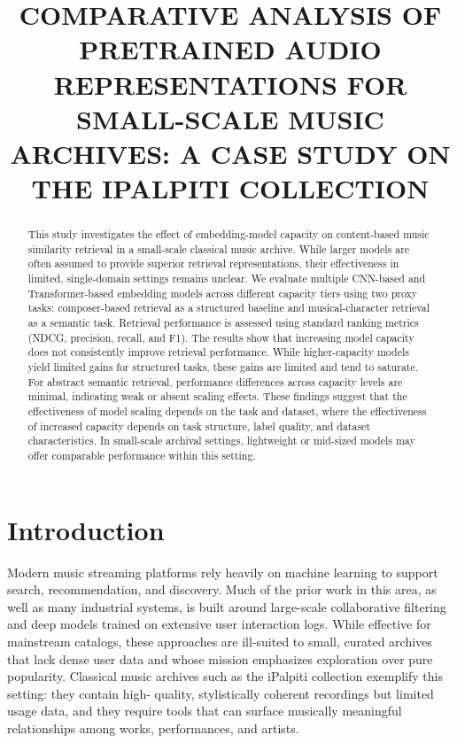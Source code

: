 \documentclass{article}
\title{COMPARATIVE ANALYSIS OF PRETRAINED AUDIO REPRESENTATIONS FOR SMALL-SCALE MUSIC ARCHIVES: A CASE STUDY ON THE IPALPITI COLLECTION}
\begin{document}
\maketitle

\begin{abstract}
This study investigates the effect of embedding-model capacity on content-based music similarity retrieval in a small-scale classical music archive. 
While larger models are often assumed to provide superior retrieval representations, their effectiveness in limited, single-domain settings remains unclear.
We evaluate multiple CNN-based and Transformer-based embedding models across different capacity tiers using two proxy tasks: composer-based retrieval as a structured baseline and musical-character retrieval as a semantic task. Retrieval performance is assessed using standard ranking metrics (NDCG, precision, recall, and F1).
The results show that increasing model capacity does not consistently improve retrieval performance. While higher-capacity models yield limited gains for structured tasks, these gains are limited and tend to saturate. For abstract semantic retrieval, performance differences across capacity levels are minimal, indicating weak or absent scaling effects.
These findings suggest that the effectiveness of model scaling depends on the task and dataset, where the effectiveness of increased capacity depends on task structure, label quality, and dataset characteristics. In small-scale archival settings, lightweight or mid-sized models may offer comparable performance within this setting.

\end{abstract}


\section{Introduction}\label{sec:introduction}
Modern music streaming platforms rely heavily on machine learning to support search, recommendation,
and discovery.
Much of the prior work in this area, as well as many industrial systems, is built around large-scale
collaborative filtering and deep models trained on extensive user interaction logs.
While effective for mainstream catalogs, these approaches are ill-suited to small, curated archives
that lack dense user data and whose mission emphasizes exploration over pure popularity.
Classical music archives such as the iPalpiti collection exemplify this setting: they contain high-
quality, stylistically coherent recordings but limited usage data, and they require tools that can
surface musically meaningful relationships among works, performances, and artists.
\end{document}

